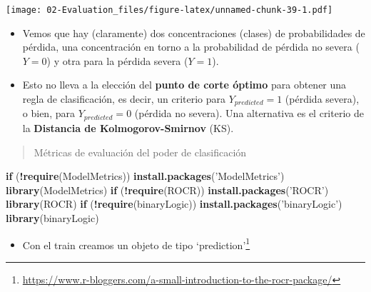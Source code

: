 \documentclass[]{book}
\newenvironment{Shaded}{\begin{snugshade}}{\end{snugshade}}
\newcommand{\ControlFlowTok}[1]{\textcolor[rgb]{0.13,0.29,0.53}{\textbf{#1}}}
\newcommand{\KeywordTok}[1]{\textcolor[rgb]{0.13,0.29,0.53}{\textbf{#1}}}
\newcommand{\NormalTok}[1]{#1}
\newcommand{\OperatorTok}[1]{\textcolor[rgb]{0.81,0.36,0.00}{\textbf{#1}}}
\newcommand{\StringTok}[1]{\textcolor[rgb]{0.31,0.60,0.02}{#1}}
\providecommand{\tightlist}{%
  \setlength{\itemsep}{0pt}\setlength{\parskip}{0pt}}
\let\rmarkdownfootnote\footnote%
\def\footnote{\protect\rmarkdownfootnote}
\begin{document}
\texttt{[image: 02-Evaluation\_files/figure-latex/unnamed-chunk-39-1.pdf]}

\begin{itemize}
\item
  Vemos que hay (claramente) dos concentraciones (clases) de probabilidades de pérdida, una concentración en torno a la probabilidad de pérdida no severa (\(Y=0\)) y otra para la pérdida severa (\(Y=1\)).
\item
  Esto no lleva a la elección del \textbf{punto de corte óptimo} para obtener una regla de clasificación, es decir, un criterio para \(Y_{predicted}=1\) (pérdida severa), o bien, para \(Y_{predicted}=0\) (pérdida no severa). Una alternativa es el criterio de la \textbf{Distancia de Kolmogorov-Smirnov} (KS).
\end{itemize}

\begin{quote}
Métricas de evaluación del poder de clasificación
\end{quote}

\begin{Shaded}
\begin{Highlighting}[]
\ControlFlowTok{if}\NormalTok{ (}\OperatorTok{!}\KeywordTok{require}\NormalTok{(ModelMetrics)) }\KeywordTok{install.packages}\NormalTok{(}\StringTok{'ModelMetrics'}\NormalTok{)}
\KeywordTok{library}\NormalTok{(ModelMetrics)}
\ControlFlowTok{if}\NormalTok{ (}\OperatorTok{!}\KeywordTok{require}\NormalTok{(ROCR)) }\KeywordTok{install.packages}\NormalTok{(}\StringTok{'ROCR'}\NormalTok{)}
\KeywordTok{library}\NormalTok{(ROCR)}
\ControlFlowTok{if}\NormalTok{ (}\OperatorTok{!}\KeywordTok{require}\NormalTok{(binaryLogic)) }\KeywordTok{install.packages}\NormalTok{(}\StringTok{'binaryLogic'}\NormalTok{)}
\KeywordTok{library}\NormalTok{(binaryLogic)}
\end{Highlighting}
\end{Shaded}

\begin{itemize}
\tightlist
\item
  Con el train creamos un objeto de tipo `prediction'\footnote{\url{https://www.r-bloggers.com/a-small-introduction-to-the-rocr-package/}}
\end{itemize}

\begin{Shaded}
\end{Shaded}
\end{document}
